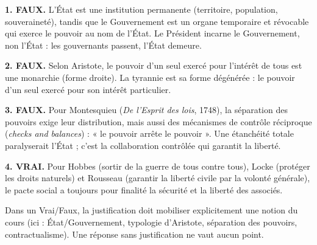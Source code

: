 \documentclass[11pt]{article}
\newcommand{\cle}[1]{{\popxbold\color{popdark}#1}}
\begin{document}
\begin{corrige}
\textbf{1. FAUX.} L'État est une institution permanente (territoire, population, souveraineté), tandis que le Gouvernement est un organe temporaire et révocable qui exerce le pouvoir au nom de l'État. Le Président incarne le Gouvernement, non l'État : les gouvernants passent, l'État demeure.

\textbf{2. FAUX.} Selon Aristote, le pouvoir d'un seul exercé pour l'intérêt de tous est une \cle{monarchie} (forme droite). La \cle{tyrannie} est sa forme dégénérée : le pouvoir d'un seul exercé pour son intérêt particulier.

\textbf{3. FAUX.} Pour Montesquieu (\emph{De l'Esprit des lois}, 1748), la séparation des pouvoirs exige leur distribution, mais aussi des mécanismes de contrôle réciproque (\emph{checks and balances}) : « le pouvoir arrête le pouvoir ». Une étanchéité totale paralyserait l'État ; c'est la collaboration contrôlée qui garantit la liberté.

\textbf{4. VRAI.} Pour Hobbes (sortir de la guerre de tous contre tous), Locke (protéger les droits naturels) et Rousseau (garantir la liberté civile par la volonté générale), le pacte social a toujours pour finalité la sécurité et la liberté des associés.
\end{corrige}

\begin{attention}
Dans un Vrai/Faux, la justification doit mobiliser explicitement une notion du cours (ici : État/Gouvernement, typologie d'Aristote, séparation des pouvoirs, contractualisme). Une réponse sans justification ne vaut aucun point.
\end{attention}
\end{document}
